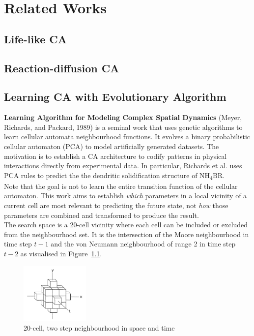 \chapter{Related Works}

\section{Life-like CA}
\section{Reaction-diffusion CA}
\section{Learning CA with Evolutionary Algorithm}

\noindent
\textbf{Learning Algorithm for Modeling Complex Spatial Dynamics} (Meyer, Richards, and Packard, 1989) \cite{meyer1989learning} is a seminal work that uses genetic algorithms to learn cellular automata neighbourhood functions. It evolves a binary probabilistic cellular automaton (PCA) to model artificially generated datasets. The motivation is to establish a CA architecture to codify patterns in physical interactions directly from experimental data. In particular, Richards et al. \cite{richards1990extracting} uses PCA rules to predict the the dendritic solidification structure of NH\textsubscript{4}BR.\\

Note that the goal is not to learn the entire transition function of the cellular automaton. This work aims to establish \textit{which} parameters in a local vicinity of a current cell are most relevant to predicting the future state, not \textit{how} those parameters are combined and transformed to produce the result.\\

The search space is a 20-cell vicinity where each cell can be included or excluded from the neighbourhood set. It is the intersection of the Moore neighbourhood in time step $t-1$ and the von Neumann neighbourhood of range 2 in time step $t-2$ as visualised in Figure~\ref{fig:20-near}.

\begin{figure}[!h]
\centering
\includegraphics[width=0.3\textwidth]{images/20_neighbourhood.png}
\caption{20-cell, two step neighbourhood in space and time}
\label{fig:20-near}
\end{figure}

